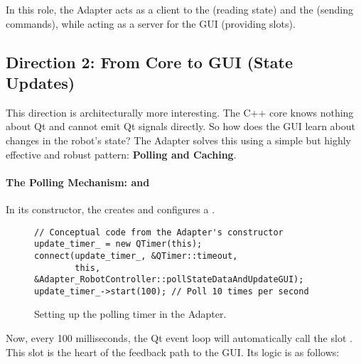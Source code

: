 In this role, the Adapter acts as a client to the  (reading state) and the  (sending commands), while acting as a server for the GUI (providing slots).


\subsection{Direction 2: From Core to GUI (State Updates)}
\label{subsec:core_to_gui}

This direction is architecturally more interesting. The C++ core knows nothing about Qt and cannot emit Qt signals directly. So how does the GUI learn about changes in the robot's state? The Adapter solves this using a simple but highly effective and robust pattern: \textbf{Polling and Caching}.

\paragraph{The Polling Mechanism:  and }
In its constructor, the  creates and configures a .

\begin{figure}[H]
\captionsetup{type=lstlisting}
\setlength{\abovecaptionskip}{-15pt}
\begin{verbatim}
// Conceptual code from the Adapter's constructor
update_timer_ = new QTimer(this);
connect(update_timer_, &QTimer::timeout,
        this, &Adapter_RobotController::pollStateDataAndUpdateGUI);
update_timer_->start(100); // Poll 10 times per second
\end{verbatim}
\caption{Setting up the polling timer in the Adapter.}
\label{lst:adapter-timer}
\end{figure}

Now, every 100 milliseconds, the Qt event loop will automatically call the slot . This slot is the heart of the feedback path to the GUI. Its logic is as follows:

